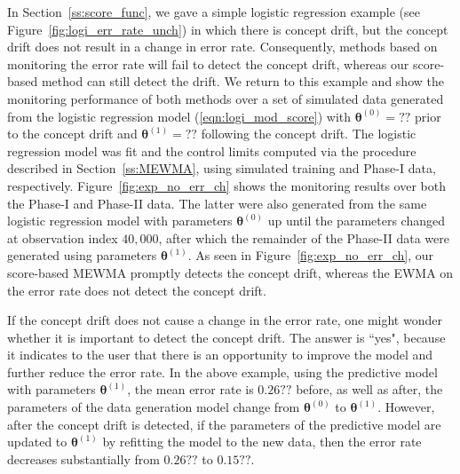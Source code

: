 \documentclass[twoside,11pt]{article}
\begin{document}
In Section~\ref{ss:score_func}, we gave a simple logistic regression example (see Figure~\ref{fig:logi_err_rate_unch}) in which there is concept drift, but the concept drift does not result in a change in error rate. Consequently, methods based on monitoring the error rate will fail to detect the concept drift, whereas our score-based method can still detect the drift. We return to this example and show the monitoring performance of both methods over a set of simulated data generated from the logistic regression model (\ref{eqn:logi_mod_score}) with $\bm{\theta}^{(0)} = ??$ prior to the concept drift and $\bm{\theta}^{(1)} = ??$ following the concept drift. The logistic regression model was fit and the control limits computed via the procedure described in Section~\ref{ss:MEWMA}, using simulated training and Phase-I data, respectively. Figure~\ref{fig:exp_no_err_ch} shows the monitoring results over both the Phase-I and Phase-II data. The latter were also generated from the same logistic regression model with parameters $\bm{\theta}^{(0)}$ up until the parameters changed at observation index $40,000$, after which the remainder of the Phase-II data were generated using parameters $\bm{\theta}^{(1)}$. As seen in Figure~\ref{fig:exp_no_err_ch}, our score-based MEWMA promptly detects the concept drift, whereas the EWMA on the error rate does not detect the concept drift. 

If the concept drift does not cause a change in the error rate, one might wonder whether it is important to detect the concept drift. The answer is ``yes", because it indicates to the user that there is an opportunity to improve the model and further reduce the error rate. In the above example, using the predictive model with parameters $\bm{\theta}^{(1)}$, the mean error rate is $0.26??$ before, as well as after, the parameters of the data generation model change from $\bm{\theta}^{(0)}$ to $\bm{\theta}^{(1)}$. However, after the concept drift is detected, if the parameters of the predictive model are updated to $\bm{\theta}^{(1)}$ by refitting the model to the new data, then the error rate decreases substantially from $0.26??$ to $0.15??$. 
\end{document}
